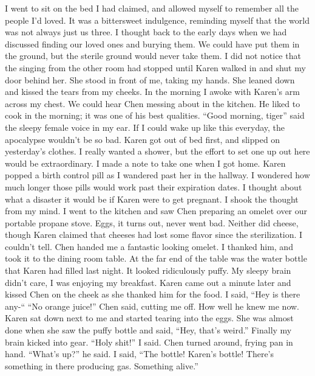 \documentclass[a4paper]{article}
\begin{document}
I went to sit on the bed I had claimed, and allowed myself to remember all the people I’d loved. It was a bittersweet indulgence, reminding myself that the world was not always just us three. I thought back to the early days when we had discussed finding our loved ones and burying them. We could have put them in the ground, but the sterile ground would never take them.
I did not notice that the singing from the other room had stopped until Karen walked in and shut my door behind her. She stood in front of me, taking my hands. She leaned down and kissed the tears from my cheeks.
In the morning I awoke with Karen’s arm across my chest. We could hear Chen messing about in the kitchen. He liked to cook in the morning; it was one of his best qualities.
“Good morning, tiger” said the sleepy female voice in my ear. If I could wake up like this everyday, the apocalypse wouldn't be so bad.
Karen got out of bed first, and slipped on yesterday’s clothes. I really wanted a shower, but the effort to set one up out here would be extraordinary. I made a note to take one when I got home.
Karen popped a birth control pill as I wandered past her in the hallway. I wondered how much longer those pills would work past their expiration dates. I thought about what a disaster it would be if Karen were to get pregnant. I shook the thought from my mind.
I went to the kitchen and saw Chen preparing an omelet over our portable propane stove. Eggs, it turns out, never went bad. Neither did cheese, though Karen claimed that cheeses had lost some flavor since the sterilization. I couldn't tell.
Chen handed me a fantastic looking omelet. I thanked him, and took it to the dining room table. At the far end of the table was the water bottle that Karen had filled last night. It looked ridiculously puffy. My sleepy brain didn’t care, I was enjoying my breakfast.
Karen came out a minute later and kissed Chen on the cheek as she thanked him for the food. I said, “Hey is there any-“
“No orange juice!” Chen said, cutting me off. How well he knew me now.
Karen sat down next to me and started tearing into the eggs. She was almost done when she saw the puffy bottle and said, “Hey, that’s weird.”
Finally my brain kicked into gear. “Holy shit!” I said.
Chen turned around, frying pan in hand. “What’s up?” he said.
I said, “The bottle! Karen’s bottle! There’s something in there producing gas. Something alive.”
\end{document}
